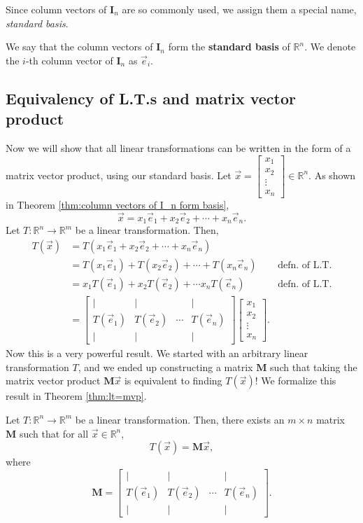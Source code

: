 \documentclass[]{book}
\newcommand{\vecxxdx}[1][x]{\ensuremath{\begin{bmatrix}
#1_1 \\
#1_2 \\
\vdots \\
#1_n
\end{bmatrix}}}
\newcommand{\sbvec}[1]{\ensuremath{\vec{e}_#1}}
\newcommand{\mat}[1]{\ensuremath{\mathbf{#1}}}
\newcommand{\idmat}[1][n]{\ensuremath{\mat{I}_#1}}
\newcommand{\R}{\ensuremath{\mathbb{R}}}
\newcommand{\Rn}{\ensuremath{\R^n}}
\newcommand{\Rm}{\ensuremath{\R^m}}
\begin{document}
Since column vectors of $\idmat$ are so commonly used, we assign them a special name, \textit{standard basis}.
\begin{definition}
    We say that the column vectors of $\idmat$ form the \textbf{standard basis} of $\R^n$. We denote the $i$-th column vector of $\idmat$ as $\vec{e}_i$.
\end{definition}


\subsection{Equivalency of L.T.s and matrix vector product}
Now we will show that all linear transformations can be written in the form of a matrix vector product, using our standard basis. Let $\vec{x} = \vecxxdx \in \Rn$. As shown in Theorem \ref{thm:column vectors of I_n form basis},
\[\vec{x} = x_1\sbvec{1} + x_2\sbvec{2} + \cdots + x_n\sbvec{n}.\]
Let $T:\R^n \to \R^m$ be a linear transformation. Then,
\begin{align*}
    T(\vec{x}) &= T(x_1\sbvec{1} + x_2\sbvec{2} + \cdots + x_n\sbvec{n}) \\
    &= T(x_1\sbvec{1}) + T(x_2\sbvec{2}) + \cdots + T(x_n\sbvec{n}) & \text{defn. of L.T.} \\
    &= x_1T(\sbvec{1}) + x_2T(\sbvec{2}) + \cdots x_nT(\sbvec{n}) & \text{defn. of L.T.} \\
    &= \begin{bmatrix}\vert & \vert && \vert \\ T(\sbvec{1}) & T(\sbvec{2}) & \cdots & T(\sbvec{n}) \\ \vert & \vert && \vert\end{bmatrix}\vecxxdx.
\end{align*}
Now this is a very powerful result. We started with an arbitrary linear transformation $T$, and we ended up constructing a matrix $\mat{M}$ such that taking the matrix vector product $\mat{M}\vec{x}$ is equivalent to finding $T(\vec{x})$! We formalize this result in Theorem \ref{thm:lt=mvp}.
\begin{theorem}
    \label{thm:lt=mvp}
    Let $T:\Rn \to \Rm$ be a linear transformation. Then, there exists an $m \times n$ matrix $\mat{M}$ such that for all $\vec{x} \in \Rn$, 
    \[T(\vec{x}) = \mat{M}\vec{x},\]
    where
    \[\mat{M} = \begin{bmatrix}\vert & \vert && \vert \\ T(\sbvec{1}) & T(\sbvec{2}) & \cdots & T(\sbvec{n}) \\ \vert & \vert && \vert\end{bmatrix}.\]
\end{theorem}
\end{document}
